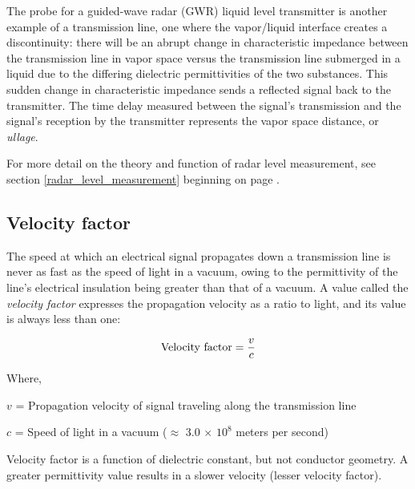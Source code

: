 The probe for a guided-wave radar (GWR) liquid level transmitter is another example of a transmission line, one where the vapor/liquid interface creates a discontinuity: there will be an abrupt change in characteristic impedance between the transmission line in vapor space versus the transmission line submerged in a liquid due to the differing dielectric permittivities of the two substances.  This sudden change in characteristic impedance sends a reflected signal back to the transmitter.  The time delay measured between the signal's transmission and the signal's reception by the transmitter represents the vapor space distance, or \textit{ullage}.      

For more detail on the theory and function of radar level measurement, see section \ref{radar_level_measurement} beginning on page \pageref{radar_level_measurement}.








\filbreak
\subsection{Velocity factor}

The speed at which an electrical signal propagates down a transmission line is never as fast as the speed of light in a vacuum, owing to the permittivity of the line's electrical insulation being greater than that of a vacuum.  A value called the \textit{velocity factor} expresses the propagation velocity as a ratio to light, and its value is always less than one:  

$$\hbox{Velocity factor} = {v \over c}$$

\noindent
Where,

$v$ = Propagation velocity of signal traveling along the transmission line

$c$ = Speed of light in a vacuum ($\approx$ 3.0 $\times$ $10^8$ meters per second)

\vskip 10pt

Velocity factor is a function of dielectric constant, but not conductor geometry.  A greater permittivity value results in a slower velocity (lesser velocity factor).









